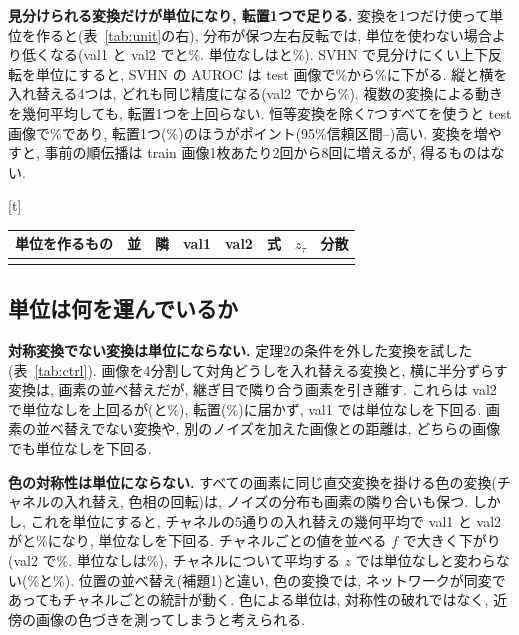 \documentclass[MIRU,submit]{miru2025j}
\makeatletter
\renewcommand{\eqref}[1]{(\ref{#1})}
\renewenvironment{table}{\@floatenv\capwidth\columnwidth\ecapwidth\columnwidth\abovecaptionskip\z@\belowcaptionskip1mm\@float{table}}{\end@float}
\makeatother
\begin{document}
\textbf{見分けられる変換だけが単位になり, 転置1つで足りる.} 変換を1つだけ使って単位を作ると(表~\ref{tab:unit}の右), 分布が保つ左右反転では, 単位を使わない場合より低くなる(val1 と val2 で\nValHfOne{}と\nValHfTwo\%. 単位なしは\nValNoneOne{}と\nValNoneTwo\%). SVHN で見分けにくい上下反転を単位にすると, SVHN の AUROC は test 画像で\nNoUnitSvhnT\%から\nUVfSvhnT\%に下がる. 縦と横を入れ替える4つは, どれも同じ精度になる(val2 で\nValSwapTwoMin{}から\nValSwapTwoMax\%). 複数の変換による動きを幾何平均しても, 転置1つを上回らない. 恒等変換を除く7つすべてを使うと test 画像で\nSevenT\%であり, 転置1つ(\nOursT\%)のほうが\nGapSevenT{}ポイント(95\%信頼区間\nGapSevenLoT--\nGapSevenHiT)高い. 変換を増やすと, 事前の順伝播は train 画像1枚あたり2回から8回に増えるが, 得るものはない.

\begin{table}[t]\centering\scriptsize\setlength{\tabcolsep}{1.5pt}\renewcommand{\arraystretch}{0.92}
\caption{\textbf{正方形の対称変換でない変換は, 単位として劣る.} 単位を作るものを替えたときの, 自然画像の分布外集合での平均 AUROC(\%. val1 と val2 画像, train 画像5000枚のバンク). 並：画素の並べ替えである. 隣：隣り合う画素を保つ. 式：式~\eqref{eq:two}に組ごとの平均と分散を入れた値(val2). $z_\tau$：表~\ref{tab:unit}と同じ. 分散：$s_r+s_\tau$ と $s_r$ の分散の比. 色の3行の右の3列は測っていない. 下の3行は変換を使わない.}
\label{tab:ctrl}
\begin{tabular}{@{}lccccccc@{}}\toprule
単位を作るもの & 並 & 隣 & val1 & val2 & 式 & $z_\tau$ & 分散\\\midrule
{}{tab_ctrl.tex}
\end{tabular}
\end{table}

\subsection{単位は何を運んでいるか}
\label{sec:ctrl}
\textbf{対称変換でない変換は単位にならない.} 定理2の条件を外した変換を試した(表~\ref{tab:ctrl}). 画像を4分割して対角どうしを入れ替える変換と, 横に半分ずらす変換は, 画素の並べ替えだが, 継ぎ目で隣り合う画素を引き離す. これらは val2 で単位なしを上回るが(\nValQswapTwo{}と\nValHshiftTwo\%), 転置(\nValTrTwo\%)に届かず, val1 では単位なしを下回る. 画素の並べ替えでない変換や, 別のノイズを加えた画像との距離は, どちらの画像でも単位なしを下回る.

\textbf{色の対称性は単位にならない.} すべての画素に同じ直交変換を掛ける色の変換(チャネルの入れ替え, 色相の回転)は, ノイズの分布も画素の隣り合いも保つ. しかし, これを単位にすると, チャネルの5通りの入れ替えの幾何平均で val1 と val2 が\nColAllOne{}と\nColAllTwo\%になり, 単位なしを下回る. チャネルごとの値を並べる $f$ で大きく下がり(val2 で\nColFTwo\%. 単位なしは\nValNoneFTwo\%), チャネルについて平均する $z$ では単位なしと変わらない(\nColZTwo\%と\nValNoneZTwo\%). 位置の並べ替え(補題1)と違い, 色の変換では, ネットワークが同変であってもチャネルごとの統計が動く. 色による単位は, 対称性の破れではなく, 近傍の画像の色づきを測ってしまうと考えられる.
\end{document}
